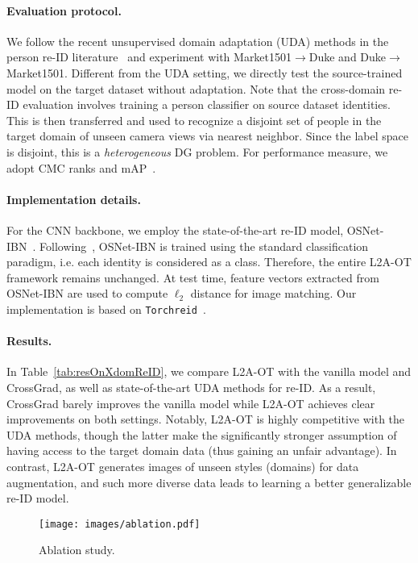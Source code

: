 \documentclass[runningheads]{llncs}
\begin{document}
\paragraph{Evaluation protocol.}
We follow the recent unsupervised domain adaptation (UDA) methods in the person re-ID literature~\cite{zhong2018gen,zhong2019camstyle,liu2019adaptive} and experiment with Market1501$\to$Duke and Duke$\to$Market1501. Different from the UDA setting, we directly test the source-trained model on the target dataset without adaptation. Note that the cross-domain re-ID evaluation involves training a person classifier on source dataset identities. This is then transferred and used to recognize a disjoint set of people in the target domain of unseen camera views via nearest neighbor. Since the label space is disjoint, this is a \emph{heterogeneous} DG problem. For performance measure, we adopt CMC ranks and mAP~\cite{zheng2015scalable}.

\paragraph{Implementation details.}
For the CNN backbone, we employ the state-of-the-art re-ID model, OSNet-IBN~\cite{zhou2019osnet,zhou2019learning}. Following~\cite{zhou2019osnet,zhou2019learning}, OSNet-IBN is trained using the standard classification paradigm, i.e. each identity is considered as a class. Therefore, the entire L2A-OT framework remains unchanged. At test time, feature vectors extracted from OSNet-IBN are used to compute $\ell_2$ distance for image matching. Our implementation is based on \texttt{Torchreid}~\cite{torchreid}.

\paragraph{Results.}
In Table~\ref{tab:resOnXdomReID}, we compare L2A-OT with the vanilla model and CrossGrad, as well as state-of-the-art UDA methods for re-ID. As a result, CrossGrad barely improves the vanilla model while L2A-OT achieves clear improvements on both settings. Notably, L2A-OT is highly competitive with the UDA methods, though the latter make the significantly stronger assumption of having access to the target domain data (thus gaining an unfair advantage). In contrast, L2A-OT generates images of unseen styles (domains) for data augmentation, and such more diverse data leads to learning a better generalizable re-ID model.

\begin{figure}[t]
    \centering
    \texttt{[image: images/ablation.pdf]}
    \caption{Ablation study.}
    \label{fig:ablation}
\end{figure}
\end{document}
